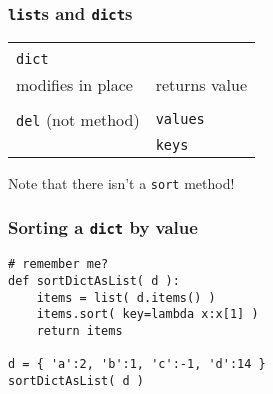 \documentclass[11pt]{beamer}
\begin{document}
\begin{frame}[fragile]
  \frametitle{\texttt{list}s and \texttt{dict}s}
  \Enlarge

  \begin{tabular}{ll}
  \hline\hline \\
  \texttt{dict} & \\
  modifies in place \hspace{2cm} & returns value \\
  \hline \\
  \texttt{del} (not method) & \texttt{values} \\
   & \texttt{keys} \\
  \end{tabular} \pause
  \begin{enumerate}
  \myitem  Note that there isn't a \texttt{sort} method!
  \end{enumerate}
\end{frame}

\begin{frame}[fragile]
  \frametitle{Sorting a \texttt{dict} by value}

  \begin{Verbatim}
# remember me?
def sortDictAsList( d ):
    items = list( d.items() )
    items.sort( key=lambda x:x[1] )
    return items

d = { 'a':2, 'b':1, 'c':-1, 'd':14 }
sortDictAsList( d )
  \end{Verbatim}
\end{frame}

\iffalse
\begin{frame}[fragile]
  \frametitle{Sorting a \texttt{dict} by value}
  \Enlarge

  We want to know which plankton species has the largest population. \pause

  \begin{Verbatim}
from csv import DictReader
reader = DictReader( open( 'plankton.csv' ) )
plankdata = {}
for row in reader:
    plankdata[ row['Species'] ] = \
        max( float( row['Near-shore, May-93']),
             float( row['Near-shore, Aug-93']),
             float( row['Off-shore, May-93']),
             float( row['Off-shore, Aug-93']) )
sortDictAsList( plankdata )
  \end{Verbatim}
\end{frame}
\fi
\end{document}
